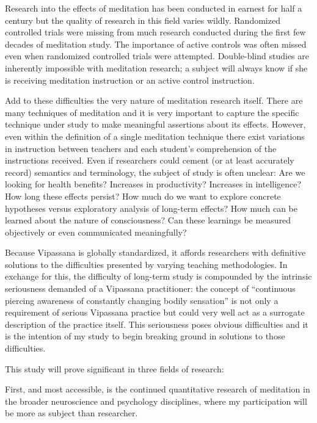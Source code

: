 \documentclass[a4paper, amsfonts, amssymb, amsmath, reprint, showkeys, nofootinbib, twoside]{revtex4-1}
\begin{document}
Research into the effects of meditation has been conducted in earnest for half a
century but the quality of research in this field varies wildly. Randomized
controlled trials were missing from much research conducted during the first few
decades of meditation study. The importance of active controls was often missed even
when randomized controlled trials were attempted. Double-blind studies are inherently
impossible with meditation research; a subject will always know if she is receiving
meditation instruction or an active control instruction. \cite{alteredtraits}

Add to these difficulties the very nature of meditation research itself. There are
many techniques of meditation and it is very important to capture the specific
technique under study to make meaningful assertions about its
effects. \cite{alteredtraits} However, even within the definition of a single
meditation technique there exist variations in instruction between
teachers and each student's comprehension of the instructions
received. \cite{davidson2015} Even if researchers could cement (or at least
accurately record) semantics and terminology, the subject of study is often unclear:
Are we looking for health benefits? Increases in productivity? Increases in
intelligence? How long these effects persist? How much do we want to explore concrete
hypotheses versus exploratory analysis of long-term effects? How much can be learned
about the nature of consciousness? Can these learnings be measured objectively or
even communicated meaningfully?

Because Vipassana is globally standardized, it affords researchers with definitive
solutions to the difficulties presented by varying teaching methodologies. In
exchange for this, the difficulty of long-term study is compounded by the intrinsic
seriousness demanded of a Vipassana practitioner: the concept of ``continuous
piercing awareness of constantly changing bodily sensation'' is not only a
requirement of serious Vipassana practice but could very well act as a surrogate
description of the practice itself. This seriousness poses obvious difficulties and
it is the intention of my study to begin breaking ground in solutions to those
difficulties.

This study will prove significant in three fields of research:

First, and most accessible, is the continued quantitative research of meditation in
the broader neuroscience and psychology disciplines, where my participation will be
more as subject than researcher.
\end{document}
